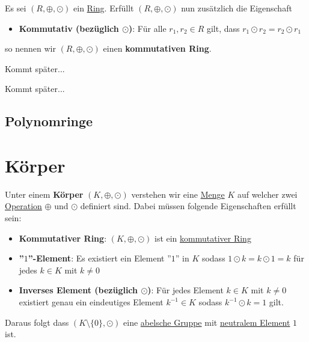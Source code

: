 \documentclass[../../main.tex]{subfiles}
\begin{document}
		\begin{definition}
			\label{def:kommutativerRing}
			Es sei $(R, \oplus, \odot)$ ein \hyperref[def:Ring]{Ring}. Erfüllt $(R, \oplus, \odot)$ nun zusätzlich die Eigenschaft 
			\begin{itemize}
				\item \textbf{Kommutativ (bezüglich $\odot$)}: Für alle $r_1,r_2 \in R$ gilt, dass $r_1 \odot r_2 = r_2 \odot r_1$
			\end{itemize}
			so nennen wir $(R, \oplus, \odot)$ einen \textbf{kommutativen Ring}.
		\end{definition}
		
		
		\begin{definition}
			Kommt später...
		\end{definition}
	
		\begin{definition}[Unterring]
			Kommt später...
		\end{definition}
	
		\subsection{Polynomringe}
		
		\section{Körper}
		\begin{definition}[Körper]
			Unter einem \textbf{Körper} $(K, \oplus, \odot)$ verstehen wir eine \hyperref[def:Menge]{Menge} $K$ auf welcher zwei \hyperref[def:Operation]{Operation} $\oplus$ und $\odot$ definiert sind. Dabei müssen folgende Eigenschaften erfüllt sein: 
			\begin{itemize}
				\item \textbf{Kommutativer Ring}: $(K, \oplus, \odot)$ ist ein \hyperref[def:kommutativerRing]{kommutativer Ring}
				\item \textbf{''$1$''-Element}: Es existiert ein Element ''$1$'' in $K$ sodass $1 \odot k = k \odot 1 = k$ für jedes $k \in K$ mit $k\not=0$ 
				\item \textbf{Inverses Element (bezüglich $\odot$)}: Für jedes Element $k\in K$ mit $k\not = 0$ existiert genau ein eindeutiges Element $k^{-1} \in K$ sodass $k^{-1} \odot k = 1$ gilt.
			\end{itemize}
			Daraus folgt dass $(K\setminus \{0\}, \odot)$ eine \hyperref[def:abelscheGruppe]{abelsche Gruppe} mit \hyperref[def:neutralesElement]{neutralem Element} $1$ ist.
		\end{definition}
	
\end{document}
